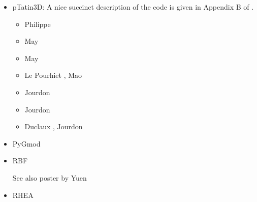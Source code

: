 \begin{itemize}
\textcite{pekr13} 
\textcite{peke20}


\item pTatin3D: A nice succinct description of the code is given in Appendix B of \cite{lemh17}. 

\begin{scriptsize}
\begin{itemize}
\item[\twothousandthirteen] Philippe \cite{phil13}
\item[\twothousandfourteen] May \etal \cite{mabl14}
\item[\twothousandfifteen] May \etal \cite{mabl15}
\item[\twothousandseventeen] Le Pourhiet \etal \cite{lemh17}, Mao \etal \cite{magm17}
\item[\twothousandeighteen] Jourdon \etal \cite{jolp18}
\item[\twothousandnineteen] Jourdon \etal \cite{jolm19}
\item[\twothousandtwenty] Duclaux \etal \cite{duhm20}, Jourdon \etal \cite{jolm20}
\end{itemize}
\end{scriptsize}

\item PyGmod 

{\small
\noindent
\textcite{crvs15}
}

\item {\codefont RBF} 

\textcite{arfw14}

See also poster by Yuen

\item RHEA 

{\scriptsize
\noindent
\textcite{bugg08}
\textcite{stgb10}
\textcite{algs12}
\textcite{busa13}
}


\end{itemize}
